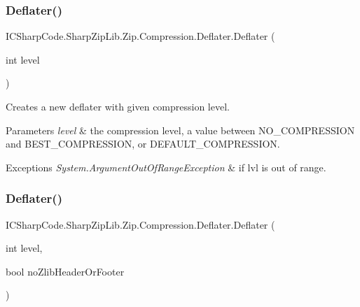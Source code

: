 \subsubsection{\texorpdfstring{Deflater()}{Deflater()}\hspace{0.1cm}{\footnotesize\ttfamily [2/6]}}
{\footnotesize\ttfamily I\+C\+Sharp\+Code.\+Sharp\+Zip\+Lib.\+Zip.\+Compression.\+Deflater.\+Deflater (\begin{DoxyParamCaption}\item[{int}]{level }\end{DoxyParamCaption})\hspace{0.3cm}{\ttfamily [inline]}}



Creates a new deflater with given compression level. 


\begin{DoxyParams}{Parameters}
{\em level} & the compression level, a value between N\+O\+\_\+\+C\+O\+M\+P\+R\+E\+S\+S\+I\+ON and B\+E\+S\+T\+\_\+\+C\+O\+M\+P\+R\+E\+S\+S\+I\+ON, or D\+E\+F\+A\+U\+L\+T\+\_\+\+C\+O\+M\+P\+R\+E\+S\+S\+I\+ON. \\
\hline
\end{DoxyParams}

\begin{DoxyExceptions}{Exceptions}
{\em System.\+Argument\+Out\+Of\+Range\+Exception} & if lvl is out of range.\\
\hline
\end{DoxyExceptions}
\mbox{\label{class_i_c_sharp_code_1_1_sharp_zip_lib_1_1_zip_1_1_compression_1_1_deflater_a8bfca90e822ab3e9984ad3287e95a61a}} 
\subsubsection{\texorpdfstring{Deflater()}{Deflater()}\hspace{0.1cm}{\footnotesize\ttfamily [3/6]}}
{\footnotesize\ttfamily I\+C\+Sharp\+Code.\+Sharp\+Zip\+Lib.\+Zip.\+Compression.\+Deflater.\+Deflater (\begin{DoxyParamCaption}\item[{int}]{level,  }\item[{bool}]{no\+Zlib\+Header\+Or\+Footer }\end{DoxyParamCaption})\hspace{0.3cm}{\ttfamily [inline]}}



